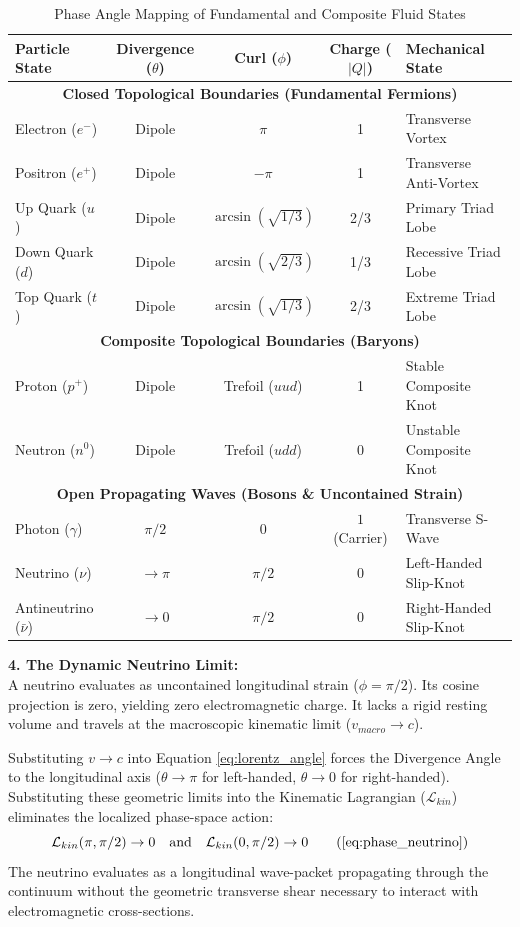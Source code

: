 \documentclass[11pt, a4paper]{article}
\begin{document}
\begin{table}[h]
\centering
\begin{tabular}{l c c c l}
\hline
\textbf{Particle State} & \textbf{Divergence ($\theta$)} & \textbf{Curl ($\phi$)} & \textbf{Charge ($|Q|$)} & \textbf{Mechanical State} \\
\hline
\multicolumn{5}{c}{\textbf{Closed Topological Boundaries (Fundamental Fermions)}} \\
\hline
Electron ($e^-$) & Dipole & $\pi$ & 1 & Transverse Vortex \\
Positron ($e^+$) & Dipole & $-\pi$ & 1 & Transverse Anti-Vortex \\
Up Quark ($u$) & Dipole & $\arcsin(\sqrt{1/3})$ & 2/3 & Primary Triad Lobe \\
Down Quark ($d$) & Dipole & $\arcsin(\sqrt{2/3})$ & 1/3 & Recessive Triad Lobe \\
Top Quark ($t$) & Dipole & $\arcsin(\sqrt{1/3})$ & 2/3 & Extreme Triad Lobe \\
\hline
\multicolumn{5}{c}{\textbf{Composite Topological Boundaries (Baryons)}} \\
\hline
Proton ($p^+$) & Dipole & Trefoil ($uud$) & 1 & Stable Composite Knot \\
Neutron ($n^0$) & Dipole & Trefoil ($udd$) & 0 & Unstable Composite Knot \\
\hline
\multicolumn{5}{c}{\textbf{Open Propagating Waves (Bosons \& Uncontained Strain)}} \\
\hline
Photon ($\gamma$) & $\pi/2$ & $0$ & $1$ (Carrier) & Transverse S-Wave \\
Neutrino ($\nu$) & $\to \pi$ & $\pi/2$ & 0 & Left-Handed Slip-Knot \\
Antineutrino ($\bar{\nu}$) & $\to 0$ & $\pi/2$ & 0 & Right-Handed Slip-Knot \\
\hline
\end{tabular}
\caption{Phase Angle Mapping of Fundamental and Composite Fluid States}
\label{tab:wave_phases}
\end{table}

\textbf{4. The Dynamic Neutrino Limit:} \\
A neutrino evaluates as uncontained longitudinal strain ($\phi = \pi/2$). Its cosine projection is zero, yielding zero electromagnetic charge. It lacks a rigid resting volume and travels at the macroscopic kinematic limit ($v_{macro} \to c$). 

Substituting $v \to c$ into Equation \ref{eq:lorentz_angle} forces the Divergence Angle to the longitudinal axis ($\theta \to \pi$ for left-handed, $\theta \to 0$ for right-handed). Substituting these geometric limits into the Kinematic Lagrangian ($\mathcal{L}_{kin}$) eliminates the localized phase-space action:
\begin{equation}
    \mathcal{L}_{kin}(\pi, \pi/2) \to 0 \quad \text{and} \quad \mathcal{L}_{kin}(0, \pi/2) \to 0 \tag{\ref{eq:phase_neutrino}}
\end{equation}
The neutrino evaluates as a longitudinal wave-packet propagating through the continuum without the geometric transverse shear necessary to interact with electromagnetic cross-sections.
\end{document}

